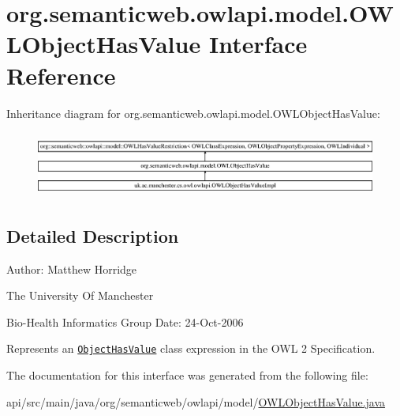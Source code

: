 \hypertarget{interfaceorg_1_1semanticweb_1_1owlapi_1_1model_1_1_o_w_l_object_has_value}{\section{org.\-semanticweb.\-owlapi.\-model.\-O\-W\-L\-Object\-Has\-Value Interface Reference}
\label{interfaceorg_1_1semanticweb_1_1owlapi_1_1model_1_1_o_w_l_object_has_value}
}
Inheritance diagram for org.\-semanticweb.\-owlapi.\-model.\-O\-W\-L\-Object\-Has\-Value\-:\begin{figure}[H]
\begin{center}
\leavevmode
\includegraphics[height=2.190352cm]{interfaceorg_1_1semanticweb_1_1owlapi_1_1model_1_1_o_w_l_object_has_value}
\end{center}
\end{figure}


\subsection{Detailed Description}
Author\-: Matthew Horridge\par
 The University Of Manchester\par
 Bio-\/\-Health Informatics Group Date\-: 24-\/\-Oct-\/2006 

Represents an \href{http://www.w3.org/TR/2009/REC-owl2-syntax-20091027/#Individual_Value_Restriction}{\tt Object\-Has\-Value} class expression in the O\-W\-L 2 Specification. 

The documentation for this interface was generated from the following file\-:\begin{DoxyCompactItemize}
\item 
api/src/main/java/org/semanticweb/owlapi/model/\hyperlink{_o_w_l_object_has_value_8java}{O\-W\-L\-Object\-Has\-Value.\-java}\end{DoxyCompactItemize}
